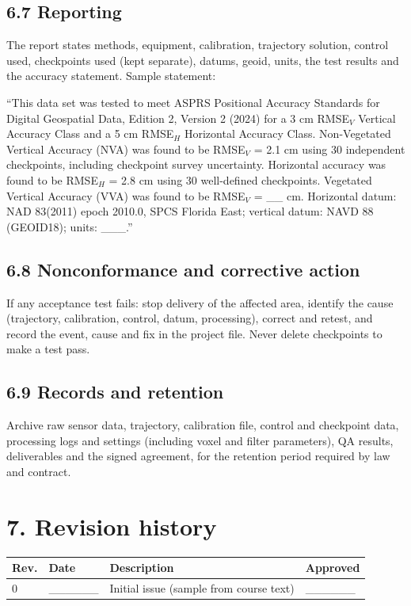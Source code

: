 \subsection*{6.7 Reporting}
The report states methods, equipment, calibration, trajectory solution, control used, checkpoints used (kept separate), datums, geoid, units, the test results and the accuracy statement. Sample statement:
\begin{tcolorbox}[base,colback=gray!4,colframe=grayx,title={Sample accuracy statement}]
``This data set was tested to meet ASPRS Positional Accuracy Standards for Digital Geospatial Data, Edition 2, Version 2 (2024) for a 3 cm RMSE$_V$ Vertical Accuracy Class and a 5 cm RMSE$_H$ Horizontal Accuracy Class. Non-Vegetated Vertical Accuracy (NVA) was found to be RMSE$_V$ = 2.1 cm using 30 independent checkpoints, including checkpoint survey uncertainty. Horizontal accuracy was found to be RMSE$_H$ = 2.8 cm using 30 well-defined checkpoints. Vegetated Vertical Accuracy (VVA) was found to be RMSE$_V$ = \_\_ cm. Horizontal datum: NAD 83(2011) epoch 2010.0, SPCS Florida East; vertical datum: NAVD 88 (GEOID18); units: \_\_\_.''
\end{tcolorbox}

\subsection*{6.8 Nonconformance and corrective action}
If any acceptance test fails: stop delivery of the affected area, identify the cause (trajectory, calibration, control, datum, processing), correct and retest, and record the event, cause and fix in the project file. Never delete checkpoints to make a test pass.

\subsection*{6.9 Records and retention}
Archive raw sensor data, trajectory, calibration file, control and checkpoint data, processing logs and settings (including voxel and filter parameters), QA results, deliverables and the signed agreement, for the retention period required by law and contract.

\section*{7. Revision history}
\begin{center}\small
\begin{tabular}{llll}\toprule
Rev. & Date & Description & Approved\\\midrule
0 & \_\_\_\_\_\_ & Initial issue (sample from course text) & \_\_\_\_\_\_\\\bottomrule
\end{tabular}\end{center}
